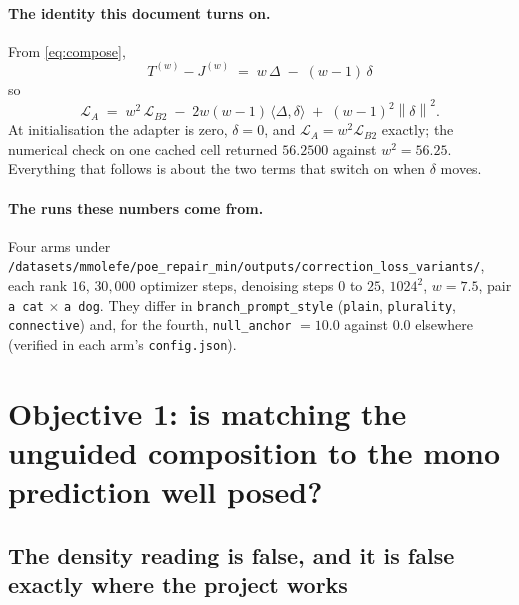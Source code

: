 \documentclass[11pt]{article}
\newcommand{\norm}[1]{\left\lVert #1 \right\rVert}
\theoremstyle{plain}
\theoremstyle{remark}
\begin{document}
\paragraph{The identity this document turns on.}
From \eqref{eq:compose},
\begin{equation}
  \boxed{\;T^{(w)} - J^{(w)} \;=\; w\,\Delta \;-\; (w-1)\,\delta\;}
  \label{eq:key}
\end{equation}
so
\begin{equation}
  \mathcal{L}_A \;=\; w^2\,\mathcal{L}_{B2}
  \;-\; 2w(w-1)\,\langle \Delta, \delta\rangle
  \;+\; (w-1)^2 \norm{\delta}^2 .
  \label{eq:expand}
\end{equation}
At initialisation the adapter is zero, $\delta = 0$, and $\mathcal{L}_A = w^2 \mathcal{L}_{B2}$
exactly; the numerical check on one cached cell returned $56.2500$ against $w^2 = 56.25$.
Everything that follows is about the two terms that switch on when $\delta$ moves.

\paragraph{The runs these numbers come from.}
Four arms under
\texttt{/datasets/mmolefe/poe\_repair\_min/}\allowbreak\texttt{outputs/correction\_loss\_variants/}, each rank $16$,
$30{,}000$ optimizer steps, denoising steps $0$ to $25$, $1024^2$, $w = 7.5$, pair
\texttt{a cat} $\times$ \texttt{a dog}. They differ in \texttt{branch\_prompt\_style}
(\texttt{plain}, \texttt{plurality}, \texttt{connective}) and, for the fourth,
\texttt{null\_anchor} $ = 10.0$ against $0.0$ elsewhere (verified in each arm's
\texttt{config.json}).

\section{Objective 1: is matching the unguided composition to the mono prediction well posed?}

\subsection{The density reading is false, and it is false exactly where the project works}
\end{document}
